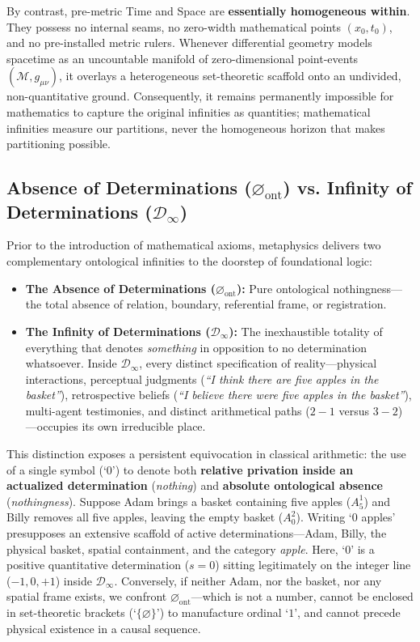 \documentclass[11pt,a4paper]{article}
\begin{document}
By contrast, pre-metric Time and Space are \textbf{essentially homogeneous within}. They possess no internal seams, no zero-width mathematical points $(x_0, t_0)$, and no pre-installed metric rulers. Whenever differential geometry models spacetime as an uncountable manifold of zero-dimensional point-events $(\mathcal{M}, g_{\mu\nu})$, it overlays a heterogeneous set-theoretic scaffold onto an undivided, non-quantitative ground. Consequently, it remains permanently impossible for mathematics to capture the original infinities as quantities; mathematical infinities measure our partitions, never the homogeneous horizon that makes partitioning possible.

\subsection{Absence of Determinations ($\varnothing_{\mathrm{ont}}$) vs. Infinity of Determinations ($\mathcal{D}_\infty$)}

Prior to the introduction of mathematical axioms, metaphysics delivers two complementary ontological infinities to the doorstep of foundational logic:

\begin{itemize}
    \item \textbf{The Absence of Determinations ($\varnothing_{\mathrm{ont}}$):} Pure ontological nothingness—the total absence of relation, boundary, referential frame, or registration.
    \item \textbf{The Infinity of Determinations ($\mathcal{D}_\infty$):} The inexhaustible totality of everything that denotes \emph{something} in opposition to no determination whatsoever. Inside $\mathcal{D}_\infty$, every distinct specification of reality—physical interactions, perceptual judgments (\emph{``I think there are five apples in the basket''}), retrospective beliefs (\emph{``I believe there were five apples in the basket''}), multi-agent testimonies, and distinct arithmetical paths ($2 - 1$ versus $3 - 2$)—occupies its own irreducible place.
\end{itemize}

This distinction exposes a persistent equivocation in classical arithmetic: the use of a single symbol (`$0$') to denote both \textbf{relative privation inside an actualized determination} (\emph{nothing}) and \textbf{absolute ontological absence} (\emph{nothingness}). Suppose Adam brings a basket containing five apples ($A_5^1$) and Billy removes all five apples, leaving the empty basket ($A_0^2$). Writing `$0$ apples' presupposes an extensive scaffold of active determinations—Adam, Billy, the physical basket, spatial containment, and the category \emph{apple}. Here, `$0$' is a positive quantitative determination ($s = 0$) sitting legitimately on the integer line ($-1, 0, +1$) inside $\mathcal{D}_\infty$. Conversely, if neither Adam, nor the basket, nor any spatial frame exists, we confront $\varnothing_{\mathrm{ont}}$—which is not a number, cannot be enclosed in set-theoretic brackets (`$\{\varnothing\}$') to manufacture ordinal `$1$', and cannot precede physical existence in a causal sequence.
\end{document}
